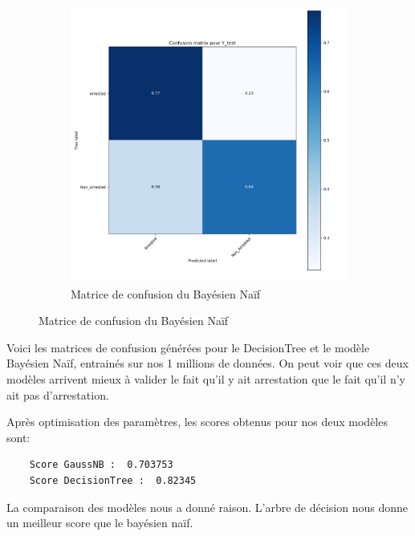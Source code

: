 \documentclass{article}
\begin{document}
\begin{figure}[H]
\begin{subfigure}{.45\textwidth}
		    \includegraphics[scale=.35]{images/MatriceConfusionGauss.png}
		    \caption{Matrice de confusion du Bayésien Naïf}
	    \end{subfigure}
    \end{figure}

    Voici les matrices de confusion générées pour le DecisionTree et le modèle 
    Bayésien Naïf, entrainés sur nos 1 millions de données. 
    On peut voir que ces deux modèles arrivent 
    mieux à valider le fait qu'il y ait arrestation que le fait qu'il n'y ait 
    pas d'arrestation.

    Après optimisation des paramètres, les scores obtenus pour nos deux modèles sont:
    \begin{Verbatim}
    Score GaussNB :  0.703753
    Score DecisionTree :  0.82345
    \end{Verbatim}

    La comparaison des modèles nous a donné raison. L'arbre de décision nous donne
    un meilleur score que le bayésien naïf.
\end{document}
